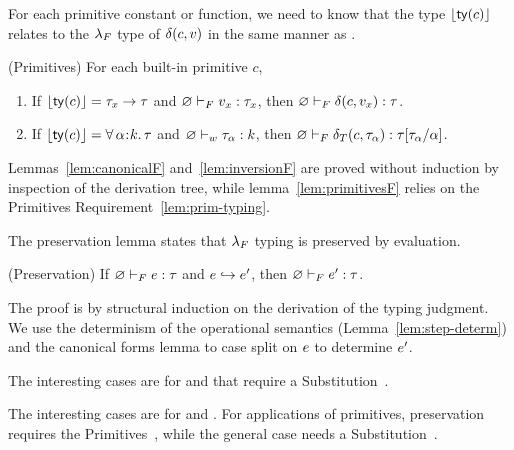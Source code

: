 \begin{fullversion}
%
For each primitive constant or function, we need 
to know that the type $\lfloor{{\mathsf{ty}}(\ensuremath{c})}\rfloor$ 
relates to the $\lambda_{F}$ type of $\delta(c,v)$ 
in the same manner as \fApp.
%

\begin{lemma}\label{lem:primitivesF}(Primitives) 
For each built-in primitive $c$, 
%
\begin{enumerate} 
\item If $\lfloor{{\mathsf{ty}}(\ensuremath{c})}\rfloor = \tau_x \rightarrow \tau$
    and ${\varnothing} \vdash_F {v_x} : {\tau_x}$, 
    then %
    ${\varnothing} \vdash_F {\delta(c,v_x)} : {\tau}$.
\item If $\lfloor{{\mathsf{ty}}(\ensuremath{c})}\rfloor = \forall\, \alpha\hspace{0.05em}{:}\hspace{0.05em} k.\, \tau$ 
    and ${\varnothing} \vdash_w {\tau_\alpha} : {k}$, 
    then %
    ${\varnothing} \vdash_F {\delta_T(c,\tau_\alpha)} : {{\tau}[\tau_\alpha/\alpha]}$.
    \end{enumerate}
\end{lemma}

Lemmas~\ref{lem:canonicalF} and~\ref{lem:inversionF} are proved without
induction by inspection of the derivation tree, 
while lemma~\ref{lem:primitivesF} relies on 
the Primitives Requirement~\ref{lem:prim-typing}. 

\end{fullversion}

 \label{sec:sysf:preservationF}
%
The preservation lemma states that $\lambda_{F}$ typing is preserved
by evaluation.
%
\begin{lemma} (Preservation) \label{lem:preservationFF} 
If ${\varnothing} \vdash_F {e} : {\tau}$ and $e \hookrightarrow e'$, 
then ${\varnothing} \vdash_F {e'} : {\tau}$.
\end{lemma}    

The proof is by structural induction on the 
derivation of the typing judgment. 
We use the determinism of the operational 
semantics (Lemma~\ref{lem:step-determ}) and 
the canonical forms lemma to case split 
on $e$ to determine $e'$.
%
\begin{conference}
The interesting cases are for \fApp and \fTApp that require 
a Substitution~.
\end{conference}
\begin{fullversion}
    The interesting cases are for \fApp and \fTApp.
    For applications of primitives, preservation 
requires the Primitives~,
while the general case needs a Substitution~.
\end{fullversion}

